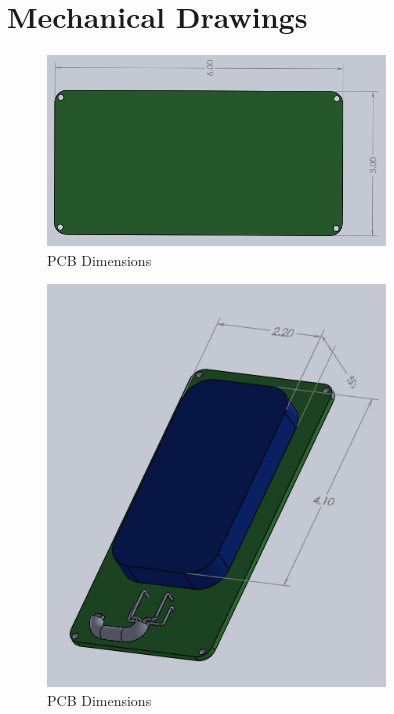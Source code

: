 \documentclass{article}
\numberwithin{figure}{section}
\numberwithin{equation}{section}
\begin{document}
{\begin{figure}[H]
	\caption{}
	\label{fig:bom2}
\end{figure}


\newpage
\section{Mechanical Drawings} \label{sect:appendixC}
\begin{figure}[H]
	\centering
	\includegraphics[width=0.8\textwidth]{PCB}
	\caption{PCB Dimensions}
	\label{fig:append_pcbdimensions}
\end{figure}

\begin{figure}[H]
	\centering
	\includegraphics[width=0.8\textwidth]{PhoneAndPCB}
	\caption{PCB Dimensions}
	\label{fig:append_pcbphone}
\end{figure}

}
\end{document}
